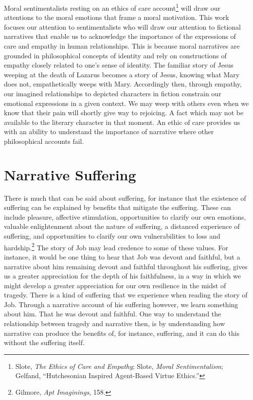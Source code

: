 \documentclass[phdthesis,12pt,final]{wuthesis}
\theoremstyle{definition}
\theoremstyle{definition}
\theoremstyle{definition}
\theoremstyle{definition}
\theoremstyle{remark}
\begin{document}
Moral sentimentalists resting on an ethics of care account\footnote{Slote, \emph{The {Ethics} of {Care} and {Empathy}}; Slote, \emph{Moral {Sentimentalism}}; Gelfand, {``Hutchesonian Inspired Agent-Based Virtue Ethics.''}} will draw our attentions to the moral emotions that frame a moral motivation. This work focuses our attention to sentimentalists who will draw our attention to fictional narratives that enable us to acknowledge the importance of the expressions of care and empathy in human relationships. This is because moral narratives are grounded in philosophical concepts of identity and rely on constructions of empathy closely related to one's sense of identity. The familiar story of Jesus weeping at the death of Lazarus becomes a story of Jesus, knowing what Mary does not, empathetically weeps with Mary. Accordingly then, through empathy, our imagined relationships to depicted characters in fiction constrain our emotional expressions in a given context. We may weep with others even when we know that their pain will shortly give way to rejoicing. A fact which may not be available to the literary character in that moment. An ethic of care provides us with an ability to understand the importance of narrative where other philosophical accounts fail.

\section{Narrative Suffering}\label{narrative-suffering}

There is much that can be said about suffering, for instance that the existence of suffering can be explained by benefits that mitigate the suffering. These can include pleasure, affective stimulation, opportunities to clarify our own emotions, valuable enlightenment about the nature of suffering, a distanced experience of suffering, and opportunities to clarify our own vulnerabilities to loss and hardship.\footnote{Gilmore, \emph{Apt {Imaginings}}, 158.} The story of Job may lead credence to some of these values. For instance, it would be one thing to hear that Job was devout and faithful, but a narrative about him remaining devout and faithful throughout his suffering, gives us a greater appreciation for the depth of his faithfulness, in a way in which we might develop a greater appreciation for our own resilience in the midst of tragedy. There is a kind of suffering that we experience when reading the story of Job. Through a narrative account of his suffering however, we learn something about him. That he was devout and faithful. One way to understand the relationship between tragedy and narrative then, is by understanding how narrative can produce the benefits of, for instance, suffering, and it can do this without the suffering itself.
\end{document}
